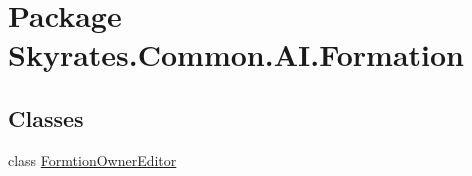 \hypertarget{namespace_skyrates_1_1_common_1_1_a_i_1_1_formation}{\section{Package Skyrates.\-Common.\-A\-I.\-Formation}
\label{namespace_skyrates_1_1_common_1_1_a_i_1_1_formation}
}
\subsection*{Classes}
\begin{DoxyCompactItemize}
\item 
class \hyperlink{class_skyrates_1_1_common_1_1_a_i_1_1_formation_1_1_formtion_owner_editor}{Formtion\-Owner\-Editor}
\end{DoxyCompactItemize}
